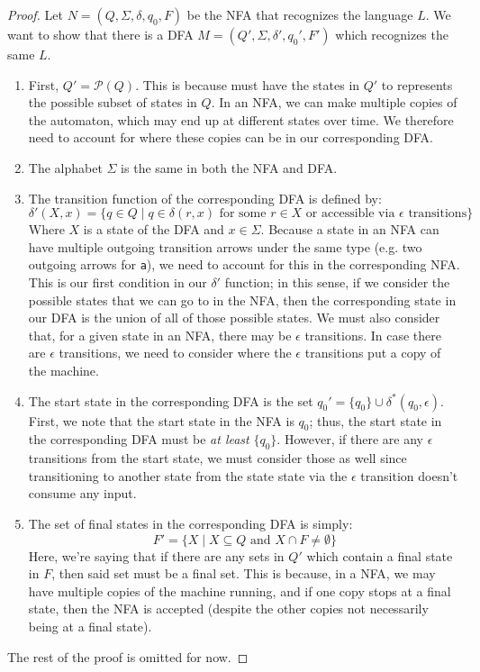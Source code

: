 \documentclass[letterpaper]{article}
\begin{document}
\begin{mdframed}[]
    \begin{proof}
        Let $N = (Q, \Sigma, \delta, q_0, F)$ be the NFA that recognizes the language $L$. We want to show that there is a DFA $M = (Q', \Sigma, \delta', q_0', F')$ which recognizes the same $L$. 
        \begin{enumerate}
            \item First, $Q' = \mathcal{P}(Q)$. This is because must have the states in $Q'$ to represents the possible subset of states in $Q$. In an NFA, we can make multiple copies of the automaton, which may end up at different states over time. We therefore need to account for where these copies can be in our corresponding DFA. 
 
            \item The alphabet $\Sigma$ is the same in both the NFA and DFA. 
 
            \item The transition function of the corresponding DFA is defined by: 
            \[\delta'(X, x) = \{q \in Q \mid q \in \delta(r, x) \text{ for some } r \in X \text{ or accessible via } \epsilon \text{ transitions}\}\]
            Where $X$ is a state of the DFA and $x \in \Sigma$. Because a state in an NFA can have multiple outgoing transition arrows under the same type (e.g. two outgoing arrows for \texttt{a}), we need to account for this in the corresponding NFA. This is our first condition in our $\delta'$ function; in this sense, if we consider the possible states that we can go to in the NFA, then the corresponding state in our DFA is the union of all of those possible states. 
            We must also consider that, for a given state in an NFA, there may be $\epsilon$ transitions. In case there are $\epsilon$ transitions, we need to consider where the $\epsilon$ transitions put a copy of the machine.

            \item The start state in the corresponding DFA is the set $q_0' = \{q_0\} \cup \delta^{*} (q_0, \epsilon)$. First, we note that the start state in the NFA is $q_0$; thus, the start state in the corresponding DFA must be \emph{at least} $\{q_0\}$. However, if there are any $\epsilon$ transitions from the start state, we must consider those as well since transitioning to another state from the state state via the $\epsilon$ transition doesn't consume any input. 

            \item The set of final states in the corresponding DFA is simply:
            \[F' = \{X \mid X \subseteq Q \text{ and } X \cap F \neq \emptyset\}\]
            Here, we're saying that if there are any sets in $Q'$ which contain a final state in $F$, then said set must be a final set. This is because, in a NFA, we may have multiple copies of the machine running, and if one copy stops at a final state, then the NFA is accepted (despite the other copies not necessarily being at a final state).
        \end{enumerate}
        The rest of the proof is omitted for now. 
    \end{proof}
\end{mdframed}
\end{document}
